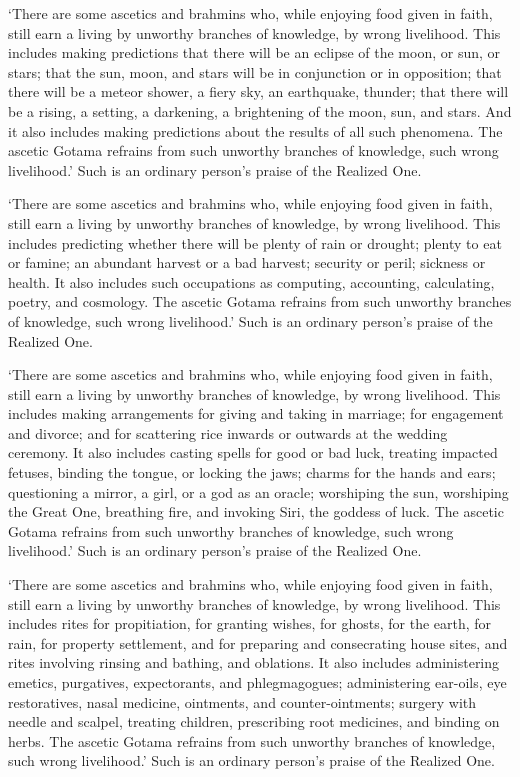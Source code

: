 \documentclass[12pt,openany]{book}%
\begin{document}
‘There are some ascetics and brahmins who, while enjoying food given in faith, still earn a living by unworthy branches of knowledge, by wrong livelihood. This includes making predictions that there will be an eclipse of the moon, or sun, or stars; that the sun, moon, and stars will be in conjunction or in opposition; that there will be a meteor shower, a fiery sky, an earthquake, thunder; that there will be a rising, a setting, a darkening, a brightening of the moon, sun, and stars. And it also includes making predictions about the results of all such phenomena. The ascetic Gotama refrains from such unworthy branches of knowledge, such wrong livelihood.’ Such is an ordinary person’s praise of the Realized One. 

‘There are some ascetics and brahmins who, while enjoying food given in faith, still earn a living by unworthy branches of knowledge, by wrong livelihood. This includes predicting whether there will be plenty of rain or drought; plenty to eat or famine; an abundant harvest or a bad harvest; security or peril; sickness or health. It also includes such occupations as computing, accounting, calculating, poetry, and cosmology. The ascetic Gotama refrains from such unworthy branches of knowledge, such wrong livelihood.’ Such is an ordinary person’s praise of the Realized One. 

‘There are some ascetics and brahmins who, while enjoying food given in faith, still earn a living by unworthy branches of knowledge, by wrong livelihood. This includes making arrangements for giving and taking in marriage; for engagement and divorce; and for scattering rice inwards or outwards at the wedding ceremony. It also includes casting spells for good or bad luck, treating impacted fetuses, binding the tongue, or locking the jaws; charms for the hands and ears; questioning a mirror, a girl, or a god as an oracle; worshiping the sun, worshiping the Great One, breathing fire, and invoking Siri, the goddess of luck. The ascetic Gotama refrains from such unworthy branches of knowledge, such wrong livelihood.’ Such is an ordinary person’s praise of the Realized One. 

‘There are some ascetics and brahmins who, while enjoying food given in faith, still earn a living by unworthy branches of knowledge, by wrong livelihood. This includes rites for propitiation, for granting wishes, for ghosts, for the earth, for rain, for property settlement, and for preparing and consecrating house sites, and rites involving rinsing and bathing, and oblations. It also includes administering emetics, purgatives, expectorants, and phlegmagogues; administering ear-oils, eye restoratives, nasal medicine, ointments, and counter-ointments; surgery with needle and scalpel, treating children, prescribing root medicines, and binding on herbs. The ascetic Gotama refrains from such unworthy branches of knowledge, such wrong livelihood.’ Such is an ordinary person’s praise of the Realized One. 
\end{document}
